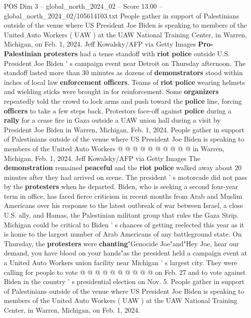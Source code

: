 \begin{textsample}{POS Dim 3 – global\_north\_2024\_02 – Score 13.00 – global\_north\_2024\_02/105614103.txt}  \label{ex:f3_pos_252}
People gather in support of Palestinians outside of the venue where US President Joe Biden is speaking to members of the United Auto Workers ( UAW ) at the UAW National Training Center, in Warren, Michigan, on Feb. 1, 2024.
Jeff Kowalsky/AFP via Getty Images \textbf{Pro-Palestinian} \textbf{protesters} had a tense standoff with \textbf{riot} \textbf{police} outside U.S.
President Joe Biden ' s campaign event near Detroit on Thursday afternoon.
The standoff lasted more than 30 minutes as dozens of \textbf{demonstrators} stood within inches of local law \textbf{enforcement} \textbf{officers}.
Teams of \textbf{riot} \textbf{police} wearing helmets and wielding sticks were brought in for reinforcement.
Some \textbf{organizers} repeatedly told the crowd to lock arms and push toward the \textbf{police} line, forcing \textbf{officers} to take a few steps back.
Protestors face-off against \textbf{police} during a \textbf{rally} for a cease fire in Gaza outside a UAW union hall during a visit by President Joe Biden in Warren, Michigan, Feb. 1, 2024.
People gather in support of Palestinians outside of the venue where US President Joe Biden is speaking to members of the United Auto Workers @ @ @ @ @ @ @ @ @ @ in Warren, Michigan, Feb. 1, 2024.
Jeff Kowalsky/AFP via Getty Images The \textbf{demonstration} remained \textbf{peaceful} and the \textbf{riot} \textbf{police} walked away about 20 minutes after they had arrived on scene.
The president ' s motorcade did not pass by the \textbf{protesters} when he departed.
Biden, who is seeking a second four-year term in office, has faced fierce criticism in recent months from Arab and Muslim Americans over his response to the latest outbreak of war between Israel, a close U.S. ally, and Hamas, the Palestinian militant group that rules the Gaza Strip.
Michigan could be critical to Biden ' s chances of getting reelected this year as it is home to the largest number of Arab Americans of any battleground state.
On Thursday, the \textbf{protesters} were \textbf{chanting}"Genocide Joe"and"Hey Joe, hear our demand, you have blood on your hands"as the president held a campaign event at a United Auto Workers union facility near Michigan ' s largest city.
They were calling for people to vote @ @ @ @ @ @ @ @ @ @ on Feb. 27 and to vote against Biden in the country ' s presidential election on Nov. 5.
People gather in support of Palestinians outside of the venue where US President Joe Biden is speaking to members of the United Auto Workers ( UAW ) at the UAW National Training Center, in Warren, Michigan, on Feb. 1, 2024.

\end{textsample}
